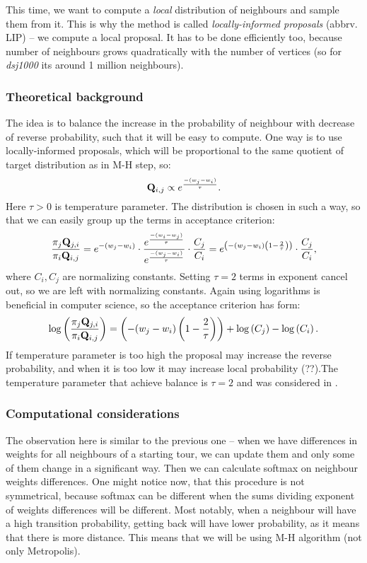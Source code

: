 	This time, we want to compute a \textit{local} distribution of neighbours and sample them from it. This is why the method is called \textit{locally-informed proposals} (abbrv. LIP) -- we compute a local proposal. It has to be done efficiently too, because number of neighbours grows quadratically with the number of vertices (so for \textit{dsj1000} its around 1 million neighbours).
	
	\subsubsection{Theoretical background}
		The idea is to balance the increase in the probability of neighbour with decrease of reverse probability, such that it will be easy to compute. One way is to use locally-informed proposals, which will be proportional to the same quotient of target distribution as in M-H step, so:
		\begin{equation*}
			\mathbf{Q}_{i,j} \propto e^\frac{-(w_{j} - w_i)}{\tau}.
		\end{equation*}
		Here $\tau>0$ is temperature parameter. The distribution is chosen in such a way, so that we can easily group up the terms in acceptance criterion:
		\begin{equation*}
			\frac{\pi_j \mathbf{Q}_{j,i}}{\pi_i \mathbf{Q}_{i,j}} = e^{-(w_j-w_i)} \cdot \frac{e^\frac{-(w_{i} - w_j)}{\tau}}{e^\frac{-(w_{j} - w_i)}{\tau}} \cdot \frac{C_j}{C_i} = e^{\left( -(w_j-w_i) \left(1 - \frac{2}{\tau}\right) \right)} \cdot \frac{C_j}{C_i},
		\end{equation*}
		where $C_i, C_j$ are normalizing constants. Setting $\tau=2$ terms in exponent cancel out, so we are left with normalizing constants. Again using logarithms is beneficial in computer science, so the acceptance criterion has form:
		\begin{equation*}
			\log\left(\frac{\pi_j \mathbf{Q}_{j,i}}{\pi_i \mathbf{Q}_{i,j}}\right) = \left( -(w_j-w_i) \left(1 - \frac{2}{\tau}\right) \right) + \log\left(C_j\right) - \log\left(C_i\right).
		\end{equation*}
		If temperature parameter is too high the proposal may increase the reverse probability, and when it is too low it may increase local probability (??).The temperature parameter that achieve balance is $\tau=2$ and was considered in \cite{zanella2020informed}.
	
	\subsubsection{Computational considerations}
		The observation here is similar to the previous one -- when we have differences in weights for all neighbours of a starting tour, we can update them and only some of them change in a significant way. Then we can calculate softmax on neighbour weights differences. One might notice now, that this procedure is not symmetrical, because softmax can be different when the sums dividing exponent of weights differences will be different. Most notably, when a neighbour will have a high transition probability, getting back will have lower probability, as it means that there is more distance. This means that we will be using M-H algorithm (not only Metropolis).
		
